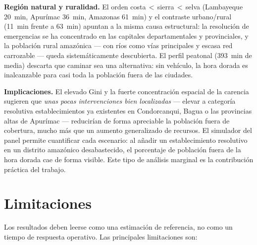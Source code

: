 \documentclass[11pt,a4paper]{article}
\begin{document}
\textbf{Regi\'on natural y ruralidad.} El orden costa\,$<$\,sierra\,$<$\,selva
(Lambayeque \SI{20}{min}, Apur\'imac \SI{36}{min}, Amazonas \SI{61}{min}) y el
contraste urbano/rural (\SI{11}{min} frente a \SI{63}{min}) apuntan a la misma
causa estructural: la resoluci\'on de emergencias se ha concentrado en las
capitales departamentales y provinciales, y la poblaci\'on rural amaz\'onica
--- con r\'ios como v\'ias principales y escasa red carrozable --- queda
sistem\'aticamente descubierta. El perfil peatonal (\num{393}~min de media)
descarta que caminar sea una alternativa: sin veh\'iculo, la hora dorada es
inalcanzable para casi toda la poblaci\'on fuera de las ciudades.

\textbf{Implicaciones.} El elevado Gini y la fuerte concentraci\'on espacial
de la carencia sugieren que \emph{unas pocas intervenciones bien localizadas}
--- elevar a categor\'ia resolutiva establecimientos ya existentes en
Condorcanqui, Bagua o las provincias altas de Apur\'imac --- reducir\'ian de
forma apreciable la poblaci\'on fuera de cobertura, mucho m\'as que un aumento
generalizado de recursos. El simulador del panel permite cuantificar cada
escenario: al a\~nadir un establecimiento resolutivo en un distrito
amaz\'onico desabastecido, el porcentaje de poblaci\'on fuera de la hora
dorada cae de forma visible. Este tipo de an\'alisis marginal es la
contribuci\'on pr\'actica del trabajo.

\section{Limitaciones}
Los resultados deben leerse como una estimaci\'on de referencia, no como un
tiempo de respuesta operativo. Las principales limitaciones son:
\end{document}
